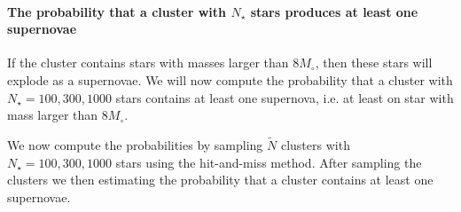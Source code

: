 \documentclass[11pt]{article}
\begin{document}
    \paragraph{\texorpdfstring{The probability that a cluster with
\(N_{\star}\) stars produces at least one
supernovae}{The probability that a cluster with N\_\{\textbackslash{}star\} stars produces at least one supernovae}}\label{the-probability-that-a-cluster-with-n_star-stars-produces-at-least-one-supernovae}

    If the cluster contains stars with masses larger than \(8 M_{\circ}\),
then these stars will explode as a supernovae. We will now compute the
probability that a cluster with \(N_{\star}=100, 300,1000\) stars
contains at least one supernova, i.e. at least on star with mass larger
than \(8 M_{\circ}\).

We now compute the probabilities by sampling \(\tilde{N}\) clusters with
\(N_{\star}=100,300,1000\) stars using the hit-and-miss method. After
sampling the clusters we then estimating the probability that a cluster
contains at least one supernovae.
\end{document}
